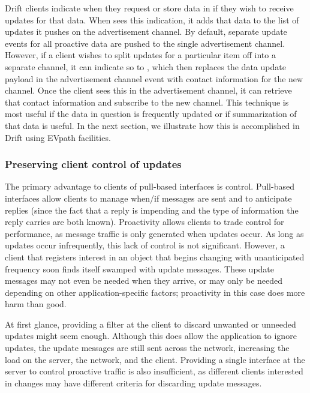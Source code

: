 Drift clients indicate when they request or store data in \driftd if they wish to receive updates for
that data.  When \driftd sees this indication, it adds that data to the list of updates it pushes on the
advertisement channel.  By default, separate update events for all proactive data are pushed to the
single advertisement channel.  However, if a client wishes to split updates for a particular item off
into a separate channel, it can indicate so to \driftd, which then replaces the data update payload in
the advertisement channel event with contact information for the new channel.  Once the client sees this
in the advertisement channel, it can retrieve that contact information and subscribe to the new channel.
This technique is most useful if the data in question is frequently updated or if summarization of that
data is useful.  In the next section, we illustrate how this is accomplished in Drift using EVpath
facilities. 

\subsubsection{Preserving client control of updates}

The primary advantage to clients of pull-based interfaces is control.  Pull-based interfaces allow
clients to manage when/if messages are sent and to anticipate replies (since the fact that a reply is
impending and the type of information the reply carries are both known).  Proactivity allows clients to
trade control for performance, as message traffic is only generated when updates occur.  As long as
updates occur infrequently, this lack of control is not significant.  However, a client that registers
interest in an object that begins changing with unanticipated frequency soon finds itself swamped with
update messages. These update messages may not even be needed when they arrive, or may only be needed
depending on other application-specific factors; proactivity in this case does more harm than good.

At first glance, providing a filter at the client to discard unwanted or unneeded updates might seem
enough.  Although this does allow the application to ignore updates, the update messages are still sent
across the network, increasing the load on the server, the network, and the client.  Providing a single
interface at the server to control proactive traffic is also insufficient, as different clients
interested in changes may have different criteria for discarding update messages.

